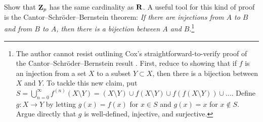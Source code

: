 \begin{challenge} Show that $\mathbf{Z}_p$ has the same cardinality as $\mathbf{R}$. A useful tool for this kind of proof is the \textsf{Cantor--Schr\"{o}der--Bernstein theorem}: \emph{If there are injections from $A$ to $B$ and from $B$ to $A$, then there is a bijection between $A$ and $B$}.\footnote{The author cannot resist outlining Cox's straightforward-to-verify proof of the Cantor--Schr\"{o}der--Bernstein result \cite{cox}. First, reduce to showing that if $f$ is an injection from a set $X$ to a subset $Y\subset X$, then there is a bijection between $X$ and $Y$. To tackle this new claim, put $S = \bigcup_{n=0}^{\infty} f^{(n)}(X\setminus Y) = (X\setminus Y) \cup f(X\setminus Y) \cup f(f(X\setminus Y)) \cup \dots$. Define $g\colon X\to Y$ by letting $g(x) = f(x)$ for $x\in S$ and $g(x) = x$ for $x\notin S$. Argue directly that $g$ is well-defined, injective, and surjective. } 
\end{challenge}


